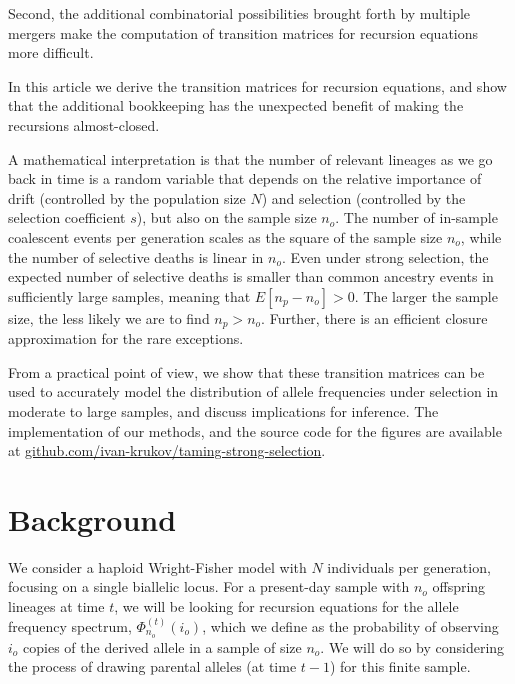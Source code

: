 \documentclass[review,nonatbib]{elsarticle}
\newcommand{\afs}[2]{\Phi_{#1}^{(#2)}}
\begin{document}
Second, the additional combinatorial possibilities brought forth by multiple mergers  make the
computation of transition matrices for recursion equations more difficult.

In this article we derive the transition matrices for recursion equations, and show that the
additional bookkeeping has the unexpected benefit of making the recursions almost-closed. 

A mathematical interpretation is that the number of relevant lineages as we go back 
in time is a random variable that depends on the relative importance of drift (controlled by 
the population size $N$) and selection (controlled by the selection coefficient $s$), 
but also on the sample size $n_o$.  The number of in-sample
coalescent events per generation scales as the square of the sample size $n_o$, while the number of
selective deaths is linear in $n_o$. Even under strong selection, the expected number of
selective deaths is smaller than common ancestry events in sufficiently large samples, meaning that 
$E[n_p- n_o]> 0.$ The larger the sample size, the less likely we are to find $n_p>n_o.$
Further, there is an efficient closure approximation for the rare exceptions.

From a practical point of view, we show that these transition matrices can 
be used to accurately model the distribution of allele frequencies under 
selection in moderate to large samples, and discuss implications for inference.
The implementation of our methods,
and the source code for the figures are available at
\url{github.com/ivan-krukov/taming-strong-selection}.


\section{Background}
\label{sec_background}

We consider a haploid Wright-Fisher model with $N$ individuals per generation, focusing on a single
biallelic locus. For a present-day sample with $n_o$ offspring lineages at time $t$, we will be
looking for recursion equations for the allele frequency spectrum, $\afs{n_o}{t}(i_o)$, which we
define as the probability of observing $i_o$ copies of the derived allele in a sample of size $n_o$.
We will do so by considering the process of drawing parental alleles (at time $t-1$) for this finite
sample.
\end{document}
